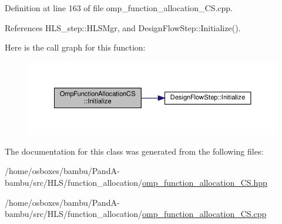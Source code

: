 Definition at line 163 of file omp\+\_\+function\+\_\+allocation\+\_\+\+C\+S.\+cpp.



References H\+L\+S\+\_\+step\+::\+H\+L\+S\+Mgr, and Design\+Flow\+Step\+::\+Initialize().

Here is the call graph for this function\+:
\nopagebreak
\begin{figure}[H]
\begin{center}
\leavevmode
\includegraphics[width=350pt]{d6/dc2/classOmpFunctionAllocationCS_a6c97b4f87a09796aa43a387460348315_cgraph}
\end{center}
\end{figure}


The documentation for this class was generated from the following files\+:\begin{DoxyCompactItemize}
\item 
/home/osboxes/bambu/\+Pand\+A-\/bambu/src/\+H\+L\+S/function\+\_\+allocation/\hyperlink{omp__function__allocation__CS_8hpp}{omp\+\_\+function\+\_\+allocation\+\_\+\+C\+S.\+hpp}\item 
/home/osboxes/bambu/\+Pand\+A-\/bambu/src/\+H\+L\+S/function\+\_\+allocation/\hyperlink{omp__function__allocation__CS_8cpp}{omp\+\_\+function\+\_\+allocation\+\_\+\+C\+S.\+cpp}\end{DoxyCompactItemize}
